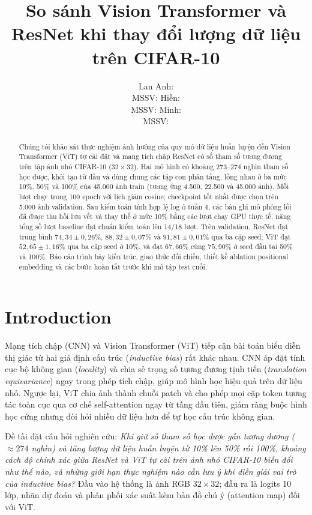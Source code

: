 \documentclass[11pt,a4paper]{article}
\title{So sánh Vision Transformer và ResNet khi thay đổi lượng dữ liệu trên CIFAR-10}
\author{Lan Anh: \underline{\hspace{1cm}} \\ MSSV: \underline{\hspace{1.5cm}}
\And Hiền: \underline{\hspace{1cm}} \\ MSSV: \underline{\hspace{1.5cm}}
\And Minh: \underline{\hspace{1cm}} \\ MSSV: \underline{\hspace{1.5cm}}}
\begin{document}
\maketitle
\begin{abstract}
Chúng tôi khảo sát thực nghiệm ảnh hưởng của quy mô dữ liệu huấn luyện đến Vision Transformer (ViT) tự cài đặt và mạng tích chập ResNet có số tham số tương đương trên tập ảnh nhỏ CIFAR-10 ($32\times32$). Hai mô hình có khoảng 273--274 nghìn tham số học được, khởi tạo từ đầu và dùng chung các tập con phân tầng, lồng nhau ở ba mức 10\%, 50\% và 100\% của 45.000 ảnh train (tương ứng 4.500, 22.500 và 45.000 ảnh). Mỗi lượt chạy trong 100 epoch với lịch giảm cosine; checkpoint tốt nhất được chọn trên 5.000 ảnh validation. Sau kiểm toán tính hợp lệ log ở tuần 4, các bản ghi mô phỏng lỗi đã được thu hồi lưu vết và thay thế ở mức 10\% bằng các lượt chạy GPU thực tế, nâng tổng số lượt baseline đạt chuẩn kiểm toán lên 14/18 lượt. Trên validation, ResNet đạt trung bình $74{,}34\pm0{,}26\%$, $88{,}32\pm0{,}07\%$ và $91{,}81\pm0{,}01\%$ qua ba cặp seed; ViT đạt $52{,}65\pm1{,}16\%$ qua ba cặp seed ở 10\%, và đạt $67{,}66\%$ cùng $75{,}90\%$ ở seed đầu tại 50\% và 100\%. Báo cáo trình bày kiến trúc, giao thức đối chiếu, thiết kế ablation positional embedding và các bước hoàn tất trước khi mở tập test cuối.
\end{abstract}

\section{Introduction}
Mạng tích chập (CNN) và Vision Transformer (ViT) tiếp cận bài toán biểu diễn thị giác từ hai giả định cấu trúc (\textit{inductive bias}) rất khác nhau. CNN áp đặt tính cục bộ không gian (\textit{locality}) và chia sẻ trọng số tương đương tịnh tiến (\textit{translation equivariance}) ngay trong phép tích chập, giúp mô hình học hiệu quả trên dữ liệu nhỏ. Ngược lại, ViT chia ảnh thành chuỗi patch và cho phép mọi cặp token tương tác toàn cục qua cơ chế self-attention ngay từ tầng đầu tiên, giảm ràng buộc hình học cứng nhưng đòi hỏi nhiều dữ liệu hơn để tự học cấu trúc không gian.

Đề tài đặt câu hỏi nghiên cứu: \textit{Khi giữ số tham số học được gần tương đương ($\approx 274$ nghìn) và tăng lượng dữ liệu huấn luyện từ 10\% lên 50\% rồi 100\%, khoảng cách độ chính xác giữa ResNet và ViT tự cài trên ảnh nhỏ CIFAR-10 biến đổi như thế nào, và những giới hạn thực nghiệm nào cần lưu ý khi diễn giải vai trò của inductive bias?} Đầu vào hệ thống là ảnh RGB $32\times32$; đầu ra là logits 10 lớp, nhãn dự đoán và phân phối xác suất kèm bản đồ chú ý (attention map) đối với ViT.
\end{document}
